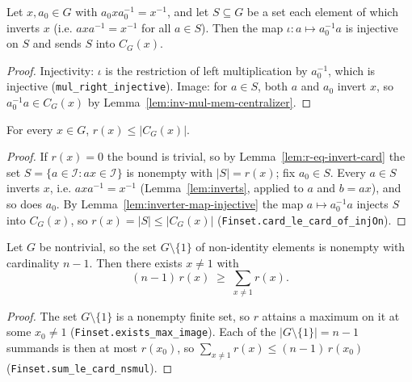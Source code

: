 \begin{lemma}
    \label{lem:inverter-map-injective}
    \leanok
    Let $x, a_0 \in G$ with $a_0 x a_0^{-1} = x^{-1}$, and let $S \subseteq G$ be
    a set each element of which inverts $x$ (i.e. $a x a^{-1} = x^{-1}$ for all
    $a \in S$). Then the map $\iota : a \mapsto a_0^{-1} a$ is injective on $S$
    and sends $S$ into $C_G(x)$.
\end{lemma}
\begin{proof}
    Injectivity: $\iota$ is the restriction of left multiplication by $a_0^{-1}$,
    which is injective (\texttt{mul\_right\_injective}). Image: for $a \in S$,
    both $a$ and $a_0$ invert $x$, so $a_0^{-1} a \in C_G(x)$ by
    Lemma~\ref{lem:inv-mul-mem-centralizer}.
\end{proof}

\begin{lemma}
    \label{lem:r-le-centralizer}
    \leanok
    For every $x \in G$, $r(x) \le |C_G(x)|$.
\end{lemma}
\begin{proof}
    If $r(x) = 0$ the bound is trivial, so by Lemma~\ref{lem:r-eq-invert-card}
    the set $S = \{a \in \mathcal{I} : a x \in \mathcal{I}\}$ is nonempty with
    $|S| = r(x)$; fix $a_0 \in S$. Every $a \in S$ inverts $x$, i.e.
    $a x a^{-1} = x^{-1}$ (Lemma~\ref{lem:inverts}, applied to $a$ and $b = ax$),
    and so does $a_0$. By Lemma~\ref{lem:inverter-map-injective} the map
    $a \mapsto a_0^{-1} a$ injects $S$ into $C_G(x)$, so
    $r(x) = |S| \le |C_G(x)|$ (\texttt{Finset.card\_le\_card\_of\_injOn}).
\end{proof}

\begin{lemma}
    \label{lem:averaging}
    \leanok
    Let $G$ be nontrivial, so the set $G \setminus \{1\}$ of non-identity
    elements is nonempty with cardinality $n - 1$. Then there exists $x \ne 1$
    with
    \[
        (n - 1)\, r(x) \;\ge\; \sum_{x \ne 1} r(x) .
    \]
\end{lemma}
\begin{proof}
    The set $G \setminus \{1\}$ is a nonempty finite set, so $r$ attains a
    maximum on it at some $x_0 \ne 1$ (\texttt{Finset.exists\_max\_image}). Each
    of the $|G \setminus \{1\}| = n - 1$ summands is then at most $r(x_0)$, so
    $\sum_{x \ne 1} r(x) \le (n-1)\, r(x_0)$
    (\texttt{Finset.sum\_le\_card\_nsmul}).
\end{proof}

